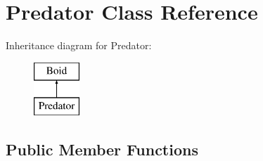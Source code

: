 \hypertarget{class_predator}{}\section{Predator Class Reference}
\label{class_predator}
Inheritance diagram for Predator\+:\begin{figure}[H]
\begin{center}
\leavevmode
\includegraphics[height=2.000000cm]{class_predator}
\end{center}
\end{figure}
\subsection*{Public Member Functions}
